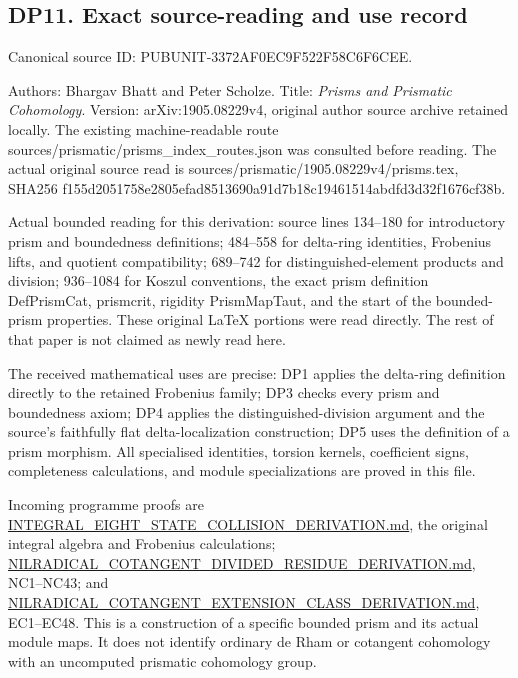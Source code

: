 \subsection{DP11. Exact source-reading and use record}\label{dp11.-exact-source-reading-and-use-record}

Canonical source ID: PUBUNIT-3372AF0EC9F522F58C6F6CEE.

Authors: Bhargav Bhatt and Peter Scholze. Title: \emph{Prisms and Prismatic Cohomology}. Version: arXiv:1905.08229v4, original author source archive retained locally. The existing machine-readable route sources/prismatic/prisms\_index\_routes.json was consulted before reading. The actual original source read is sources/prismatic/1905.08229v4/prisms.tex, SHA256
f155d2051758e2805efad8513690a91d7b18c19461514abdfd3d32f1676cf38b.

Actual bounded reading for this derivation: source lines 134--180 for introductory prism and boundedness definitions; 484--558 for delta-ring identities, Frobenius lifts, and quotient compatibility; 689--742 for distinguished-element products and division; 936--1084 for Koszul conventions, the exact prism definition DefPrismCat, prismcrit, rigidity PrismMapTaut, and the start of the bounded-prism properties. These original LaTeX portions were read directly. The rest of that paper is not claimed as newly read here.

The received mathematical uses are precise: DP1 applies the delta-ring definition directly to the retained Frobenius family; DP3 checks every prism and boundedness axiom; DP4 applies the distinguished-division argument and the source's faithfully flat delta-localization construction; DP5 uses the definition of a prism morphism. All specialised identities, torsion kernels, coefficient signs, completeness calculations, and module specializations are proved in this file.

Incoming programme proofs are \url{INTEGRAL_EIGHT_STATE_COLLISION_DERIVATION.md}, the original integral algebra and Frobenius calculations; \url{NILRADICAL_COTANGENT_DIVIDED_RESIDUE_DERIVATION.md}, NC1--NC43; and \url{NILRADICAL_COTANGENT_EXTENSION_CLASS_DERIVATION.md}, EC1--EC48. This is a construction of a specific bounded prism and its actual module maps. It does not identify ordinary de Rham or cotangent cohomology with an uncomputed prismatic cohomology group.
